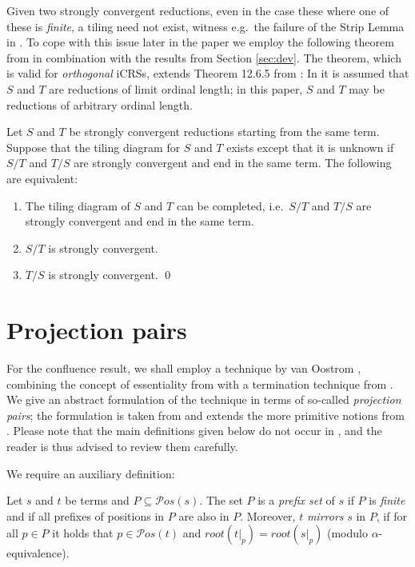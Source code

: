 \documentclass{LMCS}
\theoremstyle{plain}
\theoremstyle{definition}
\newcommand{\pos}[1]{\mathcal{P}os(#1)}
\newcommand{\rs}[1]{root(#1)}
\begin{document}
Given two strongly convergent reductions, even in the case these where one of these is \emph{finite}, a tiling need not exist, witness e.g.\ the failure of the Strip Lemma in \cite{KKSV97}. To cope with this issue later in the paper we employ the following theorem from \cite{JJ05b} in combination with the results from Section \ref{sec:dev}. The theorem, which is valid for \emph{orthogonal} iCRSs, extends Theorem 12.6.5 from \cite{T03_KV}: In \cite{T03_KV} it is assumed that $S$ and $T$ are reductions of limit ordinal length; in this paper,
$S$ and $T$ may be reductions of arbitrary ordinal length.

\begin{thm}
\label{the:tiling_completion_convergence}
Let $S$ and $T$ be strongly convergent reductions starting from the same term. Suppose that the tiling diagram for $S$ and $T$ exists except that it is unknown if $S/T$ and $T/S$ are strongly convergent and end in the same term. The following are equivalent:
\begin{enumerate}[\em(1)]
\item
The tiling diagram of $S$ and $T$ can be completed, i.e.\ $S/T$ and $T/S$ are strongly convergent and end in the same term.
\item
$S/T$ is strongly convergent.
\item
$T/S$ is strongly convergent. \qed
\end{enumerate}
\end{thm}


\section{Projection pairs}
\label{sec:pp}

\noindent For the confluence result, we shall employ a technique by
van Oostrom \cite{O99}, combining the concept of essentiality from
\cite{K88,GK94} with a termination technique from \cite{SR90,M97}.  We
give an abstract formulation of the technique in terms of so-called
\emph{projection pairs}; the formulation is taken from \cite{K08} and
extends the more primitive notions from \cite{paper_iii}. Please note
that the main definitions given below do not occur in
\cite{paper_iii}, and the reader is thus advised to review them
carefully.

We require an auxiliary definition:

\begin{defi}
Let $s$ and $t$ be terms and $P \subseteq \pos{s}$. The set $P$ is a \emph{prefix set} of $s$ if $P$ is \emph{finite} and if all prefixes of positions in $P$ are also in $P$. Moreover, $t$ \emph{mirrors} $s$ in $P$, if for all $p \in P$ it holds that $p \in \pos{t}$ and $\rs{t|_p} = \rs{s|_p}$ (modulo $\alpha$-equivalence).
\end{defi}
\end{document}
